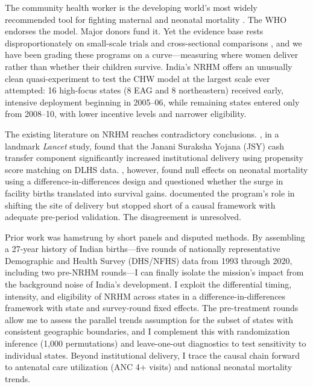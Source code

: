 \documentclass[12pt]{article}
\begin{document}
The community health worker is the developing world's most widely recommended tool for fighting maternal and neonatal mortality \citep{perry2014community, lehmann2007community}. The WHO endorses the model. Major donors fund it. Yet the evidence base rests disproportionately on small-scale trials and cross-sectional comparisons \citep{haines2007achieving}, and we have been grading these programs on a curve---measuring where women deliver rather than whether their children survive. India's NRHM offers an unusually clean quasi-experiment to test the CHW model at the largest scale ever attempted: 16 high-focus states (8 EAG and 8 northeastern) received early, intensive deployment beginning in 2005--06, while remaining states entered only from 2008--10, with lower incentive levels and narrower eligibility.

The existing literature on NRHM reaches contradictory conclusions. \citet{lim2010india}, in a landmark \emph{Lancet} study, found that the Janani Suraksha Yojana (JSY) cash transfer component significantly increased institutional delivery using propensity score matching on DLHS data. \citet{powell2015did}, however, found null effects on neonatal mortality using a difference-in-differences design and questioned whether the surge in facility births translated into survival gains. \citet{mazumdar2014india} documented the program's role in shifting the site of delivery but stopped short of a causal framework with adequate pre-period validation. The disagreement is unresolved.

Prior work was hamstrung by short panels and disputed methods. By assembling a 27-year history of Indian births---five rounds of nationally representative Demographic and Health Survey (DHS/NFHS) data from 1993 through 2020, including two pre-NRHM rounds---I can finally isolate the mission's impact from the background noise of India's development. I exploit the differential timing, intensity, and eligibility of NRHM across states in a difference-in-differences framework with state and survey-round fixed effects. The pre-treatment rounds allow me to assess the parallel trends assumption for the subset of states with consistent geographic boundaries, and I complement this with randomization inference (1,000 permutations) and leave-one-out diagnostics to test sensitivity to individual states. Beyond institutional delivery, I trace the causal chain forward to antenatal care utilization (ANC 4+ visits) and national neonatal mortality trends.
\end{document}
